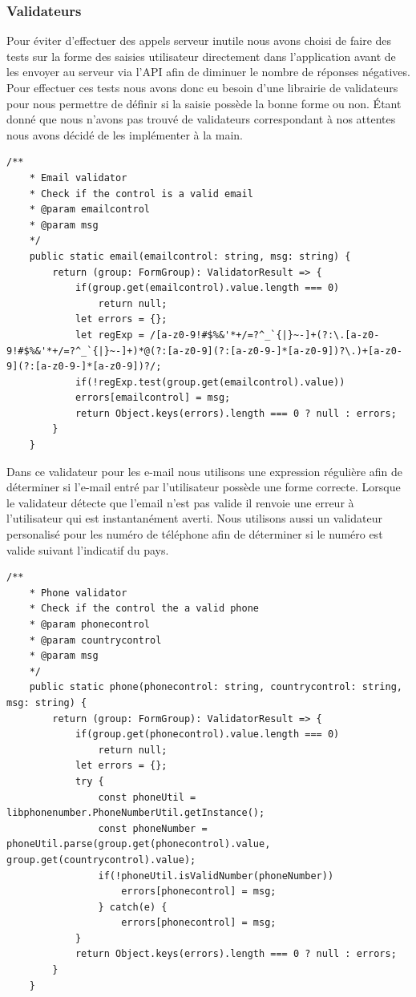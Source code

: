\documentclass[french]{article}
\begin{document}
	\subsubsection{Validateurs}
	
	Pour éviter d'effectuer des appels serveur inutile nous avons choisi de faire des tests sur la forme des saisies utilisateur directement dans l'application avant de les envoyer au serveur via l'API afin de diminuer le nombre de réponses négatives. Pour effectuer ces tests nous avons donc eu besoin d'une librairie de validateurs pour nous permettre de définir si la saisie possède la bonne forme ou non. 
	Étant donné que nous n'avons pas trouvé de validateurs correspondant à nos attentes nous avons décidé de les implémenter à la main.
	
	\begin{lstlisting}[style=htmlcssjs]
	/**
	* Email validator
	* Check if the control is a valid email
	* @param emailcontrol
	* @param msg
	*/
	public static email(emailcontrol: string, msg: string) {
		return (group: FormGroup): ValidatorResult => {
			if(group.get(emailcontrol).value.length === 0)
				return null;
			let errors = {};
			let regExp = /[a-z0-9!#$%&'*+/=?^_`{|}~-]+(?:\.[a-z0-9!#$%&'*+/=?^_`{|}~-]+)*@(?:[a-z0-9](?:[a-z0-9-]*[a-z0-9])?\.)+[a-z0-9](?:[a-z0-9-]*[a-z0-9])?/;
			if(!regExp.test(group.get(emailcontrol).value))
			errors[emailcontrol] = msg;
			return Object.keys(errors).length === 0 ? null : errors;
		}
	}
	\end{lstlisting}
	
	Dans ce validateur pour les e-mail nous utilisons une expression régulière afin de déterminer si l'e-mail entré par l'utilisateur possède une forme correcte. Lorsque le validateur détecte que l'email n'est pas valide il renvoie une erreur à l'utilisateur qui est instantanément averti.
	Nous utilisons aussi un validateur personalisé pour les numéro de téléphone afin de déterminer si le numéro est valide suivant l'indicatif du pays. 
	\begin{lstlisting}[style=htmlcssjs]
	/**
	* Phone validator
	* Check if the control the a valid phone
	* @param phonecontrol
	* @param countrycontrol
	* @param msg
	*/
	public static phone(phonecontrol: string, countrycontrol: string, msg: string) {
		return (group: FormGroup): ValidatorResult => {
			if(group.get(phonecontrol).value.length === 0)
				return null;
			let errors = {};
			try {
				const phoneUtil = libphonenumber.PhoneNumberUtil.getInstance();
				const phoneNumber = phoneUtil.parse(group.get(phonecontrol).value, group.get(countrycontrol).value);
				if(!phoneUtil.isValidNumber(phoneNumber))
					errors[phonecontrol] = msg;
				} catch(e) {
					errors[phonecontrol] = msg;
			}
			return Object.keys(errors).length === 0 ? null : errors;
		}
	}
	\end{lstlisting}
	
\end{document}
